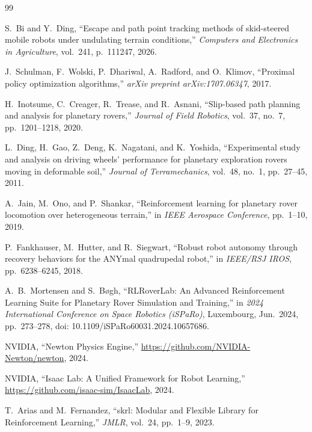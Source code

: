 \documentclass[12pt,a4paper]{article}
\begin{document}
\newpage
\begin{thebibliography}{99}

S.~Bi and Y.~Ding, ``Escape and path point tracking methods of skid-steered mobile robots under undulating terrain conditions,'' \textit{Computers and Electronics in Agriculture}, vol.~241, p.~111247, 2026.

J.~Schulman, F.~Wolski, P.~Dhariwal, A.~Radford, and O.~Klimov, ``Proximal policy optimization algorithms,'' \textit{arXiv preprint arXiv:1707.06347}, 2017.

H.~Inotsume, C.~Creager, R.~Trease, and R.~Asnani, ``Slip-based path planning and analysis for planetary rovers,'' \textit{Journal of Field Robotics}, vol.~37, no.~7, pp.~1201--1218, 2020.

L.~Ding, H.~Gao, Z.~Deng, K.~Nagatani, and K.~Yoshida, ``Experimental study and analysis on driving wheels' performance for planetary exploration rovers moving in deformable soil,'' \textit{Journal of Terramechanics}, vol.~48, no.~1, pp.~27--45, 2011.

A.~Jain, M.~Ono, and P.~Shankar, ``Reinforcement learning for planetary rover locomotion over heterogeneous terrain,'' in \textit{IEEE Aerospace Conference}, pp.~1--10, 2019.

P.~Fankhauser, M.~Hutter, and R.~Siegwart, ``Robust robot autonomy through recovery behaviors for the ANYmal quadrupedal robot,'' in \textit{IEEE/RSJ IROS}, pp.~6238--6245, 2018.

A.~B.~Mortensen and S.~B{\o}gh, ``RLRoverLab: An Advanced Reinforcement Learning Suite for Planetary Rover Simulation and Training,'' in \textit{2024 International Conference on Space Robotics (iSPaRo)}, Luxembourg, Jun.\ 2024, pp.~273--278, doi: 10.1109/iSPaRo60031.2024.10657686.

NVIDIA, ``Newton Physics Engine,'' \url{https://github.com/NVIDIA-Newton/newton}, 2024.

NVIDIA, ``Isaac Lab: A Unified Framework for Robot Learning,'' \url{https://github.com/isaac-sim/IsaacLab}, 2024.

T.~Arias and M.~Fernandez, ``skrl: Modular and Flexible Library for Reinforcement Learning,'' \textit{JMLR}, vol.~24, pp.~1--9, 2023.


\end{thebibliography}
\end{document}
